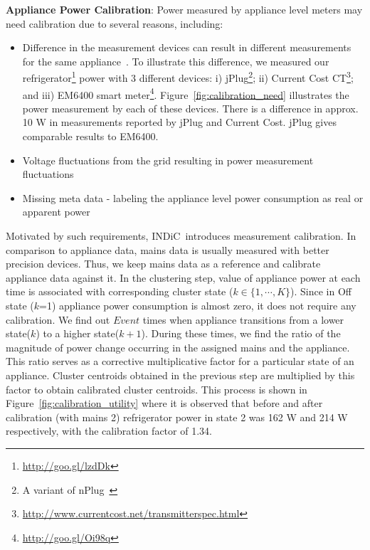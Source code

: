\documentclass[conference]{IEEEtran}
\newcommand{\redcolor}[1]{\textcolor{red}{#1}}
\newcommand{\figref}[1]{Figure~\ref{#1}}
\newcommand{\indic}{INDiC~}
\newcommand{\denselistbib}{
  \itemsep -.6pt\topsep-4pt\partopsep-4pt
}
\begin{document}
\noindent\textbf{Appliance Power Calibration}: 
Power measured by appliance level meters may need calibration due to several reasons, including:\vspace{-2.5mm}
\begin{itemize}\denselistbib
\item Difference in the measurement devices can result in different measurements for the same appliance~\cite{berges2008}. To illustrate this difference, we measured our refrigerator\footnote{
\url{http://goo.gl/lzdDk}} power with 3 different devices: i) jPlug\footnote{A variant of nPlug~\cite{nplug}}; ii) Current Cost CT\footnote{\url{http://www.currentcost.net/transmitterspec.html}}; and iii) EM6400 smart meter\footnote{\url{http://goo.gl/Oi98q}}. 
\figref{fig:calibration_need} illustrates the power measurement by each of these devices. There is a difference in approx. 10 W in measurements reported by jPlug and Current Cost. jPlug gives comparable results to EM6400.
\item Voltage fluctuations from the grid resulting in power measurement fluctuations~\cite{hart}
\item Missing meta data - labeling the appliance level power consumption as real or apparent power 
\vspace{-1mm} \end{itemize}

\noindent Motivated by such requirements, \indic introduces measurement calibration. In comparison to appliance data, mains data is usually measured with better precision devices. Thus, we keep mains data as a reference and calibrate appliance data against it. In the clustering step, value of appliance power at each time is associated with corresponding cluster state ($k \in \{1,\cdots,K\}$). Since in Off state ($k$=1) appliance power consumption is almost zero, it does not require any calibration. We find out $Event$ times when appliance transitions from a lower state($k$) to a higher state($k+1$). During these times, we find the ratio of the magnitude of power change occurring in the assigned mains and the appliance. This ratio serves as a corrective multiplicative factor for a particular  state of an appliance. Cluster centroids obtained in the previous step are multiplied by this factor to obtain calibrated cluster centroids. This process is shown in \figref{fig:calibration_utility} where it is observed that before and after calibration (with mains 2) refrigerator power in state 2 was 162 W and 214 W respectively, with the calibration factor of 1.34.
\end{document}
